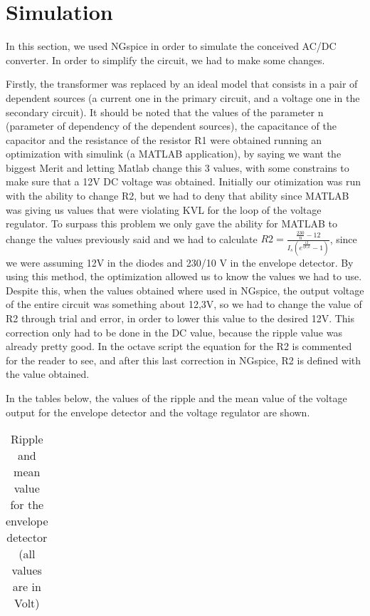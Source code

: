 \section{Simulation}
\label{sec:simulation}

\par In this section, we used NGspice in order to simulate the conceived AC/DC converter. In order to simplify the circuit, we had to make some changes.
\par Firstly, the transformer was replaced by an ideal model that consists in a pair of dependent sources (a current one in the primary circuit, and a voltage one in the secondary circuit). It should be noted that the values of the parameter n (parameter of dependency of the dependent sources), the capacitance of the capacitor and the resistance of the resistor R1 were obtained running an optimization with simulink (a MATLAB application), by saying we want the biggest Merit and letting Matlab change this 3 values, with some constrains to make sure that a 12V DC voltage was obtained. Initially our otimization was run with the ability to change R2, but we had to deny that ability since MATLAB was giving us values that were violating KVL for the loop of the voltage regulator. To surpass this problem we only gave the ability for MATLAB to change the values previously said and we had to calculate $R2 = \frac{\frac{230}{n}-12}{I_s(e^{\frac{12}{\eta V_tk}}-1)}$, since we were assuming 12V in the diodes and 230/10 V in the envelope detector. By using this method, the optimization allowed us to know the values we had to use. Despite this, when the values obtained where used in NGspice, the output voltage of the entire circuit was something about 12,3V, so we had to change the value of R2 through trial and error, in order to lower this value to the desired 12V. This correction only had to be done in the DC value, because the ripple value was already pretty good. In the octave script the equation for the R2 is commented for the reader to see, and after this last correction in NGspice, R2 is defined with the value obtained.
\par In the tables below, the values of the ripple and the mean value of the voltage output for the envelope detector and the voltage regulator are shown.

\vspace{5mm}
\begin{table}[H]
\centering
\begin{tabularx}{0.9\textwidth} {
  | >{\raggedright\arraybackslash}X
  | >{\raggedleft\arraybackslash}X | }
 \hline

\end{tabularx}
\caption{\label{tab:Table 4} Ripple and mean value for the envelope detector (all values are in Volt)}
\end{table}
\vspace{5mm}

